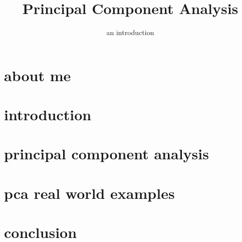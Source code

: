 

\title{Principal Component Analysis}
\subtitle{an introduction} 


	

    \section[about]{about me}
        
        
    \section[intro]{introduction}
        
        
    \section[pca]{principal component analysis}
        
        
    \section[examples]{pca real world examples}
        

    \section{conclusion}
        
        




